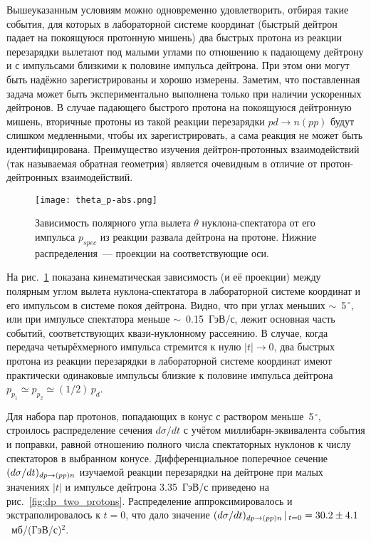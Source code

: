 Вышеуказанным условиям можно одновременно удовлетворить, отбирая такие события,
для которых в лабораторной системе координат (быстрый дейтрон падает на
покоящуюся протонную мишень) два быстрых протона из реакции перезарядки \dpchex
вылетают под малыми углами по отношению к падающему дейтрону и с импульсами
близкими к половине импульса дейтрона. При этом они могут быть надёжно
зарегистрированы и хорошо измерены. Заметим, что поставленная задача может быть
экспериментально выполнена только при наличии ускоренных дейтронов. В случае
падающего быстрого протона на покоящуюся дейтронную мишень, вторичные протоны из
такой реакции перезарядки $pd \rightarrow n(pp)$ будут слишком медленными, чтобы
их зарегистрировать, а сама реакция не может быть идентифицирована. Преимущество
изучения дейтрон-протонных взаимодействий (так называемая обратная геометрия)
является очевидным в отличие от протон-дейтронных взаимодействий.

\begin{figure}[h]
  \centering
  \vspace{-2ex}
  \texttt{[image: theta\_p-abs.png]}
  \vspace{-2ex}
  \caption{Зависимость полярного угла вылета $\theta$ нуклона-спектатора от его
    импульса $p_{spec}$ из реакции развала дейтрона на протоне. Нижние
    распределения~--- проекции на соответствующие оси.}
  \label{fig:theta_p}
\end{figure}

На рис.~\ref{fig:theta_p} показана кинематическая зависимость (и её проекции)
между полярным углом вылета нуклона-спектатора в лабораторной системе координат
и его импульсом в системе покоя дейтрона. Видно, что при углах меньших
$\sim$~5$^{\,\circ}$, или при импульсе спектатора меньше $\sim$~0.15~ГэВ/с,
лежит основная часть событий, соответствующих квази-нуклонному рассеянию. В
случае, когда передача четырёхмерного импульса стремится к нулю
$|t| \rightarrow 0$, два быстрых протона из реакции перезарядки в лабораторной
системе координат имеют практически одинаковые импульсы близкие к половине
импульса дейтрона $p_{p_1} \simeq p_{p_2} \simeq (1/2)\,p_d$.

Для набора пар протонов, попадающих в конус с раствором меньше~5$^{\,\circ}$,
строилось распределение сечения $d\sigma/dt$ с учётом миллибарн-эквивалента
события и поправки, равной отношению полного числа спектаторных нуклонов к числу
спектаторов в выбранном конусе. Дифференциальное поперечное сечение
$(d\sigma/dt)_{dp \rightarrow (pp)n}$ изучаемой реакции перезарядки на дейтроне при малых
значениях $|t|$ и импульсе дейтрона 3.35~ГэВ/с приведено на
рис.~\ref{fig:dp_two_protons}. Распределение аппроксимировалось и
экстраполировалось к $t=0$, что дало значение
$(d\sigma/dt)_{dp \rightarrow (pp)n}\,|\,_{t=0} = 30.2 \pm 4.1$~мб/(ГэВ/с)$^{2}$.

